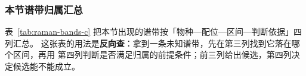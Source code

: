 \subsubsection{本节谱带归属汇总}

表~\ref{tab:raman-bands-c} 把本节出现的谱带按「物种—配位—区间—判断依据」四列汇总。
这张表的用法是\textbf{反向查}：拿到一条未知谱带，先在第三列找到它落在哪个区间，再用
第四列判断是否满足归属的前提条件；前三列给出候选，第四列决定候选能不能成立。

